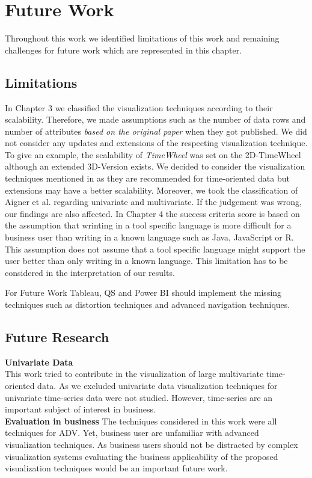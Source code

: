 \chapter{Future Work}
\label{Future Work}
Throughout this work we identified limitations of this work and remaining challenges for future work which are represented in this chapter. 

\section{Limitations} \label{limitations}
In Chapter 3 we classified the visualization techniques according to their scalability. Therefore, we made assumptions such as the number of data rows and number of attributes \textit{based on the original paper} when they got published. We did not consider any updates and extensions of the respecting visualization technique. To give an example, the scalability of \textit{TimeWheel} was set on the 2D-TimeWheel although an extended 3D-Version exists. We decided to consider the visualization techniques mentioned in\cite{Aigner2011} as they are recommended for time-oriented data but extensions may have a better scalability.  
Moreover, we took the classification of Aigner et al.\cite{Aigner2011} regarding univariate and multivariate. If the judgement was wrong, our findings are also affected.
In Chapter 4 the success criteria score is based on the assumption that wrinting in a tool specific language is more difficult for a business user than writing in a known language such as Java, JavaScript or R. This assumption does not assume that a tool specific language might support the user better than only writing in a known language. This limitation has to be considered in the interpretation of our results.



For Future Work Tableau, QS and Power BI should implement the missing techniques such as distortion techniques and advanced navigation techniques. 
\section{Future Research}
\textbf{Univariate Data}\\
This work tried to contribute in the visualization of large multivariate time-oriented data. As we excluded univariate data visualization techniques for univariate time-series data were not studied. However, time-series are an important subject of interest in business.\\
\textbf{Evaluation in business}
The techniques considered in this work were all techniques for ADV. Yet, business user are unfamiliar with advanced visualization techniques. 
As business users should not be distracted by complex visualization systems \cite{Tegarden1999} evaluating the business applicability of the proposed visualization techniques would be an important future work. 






